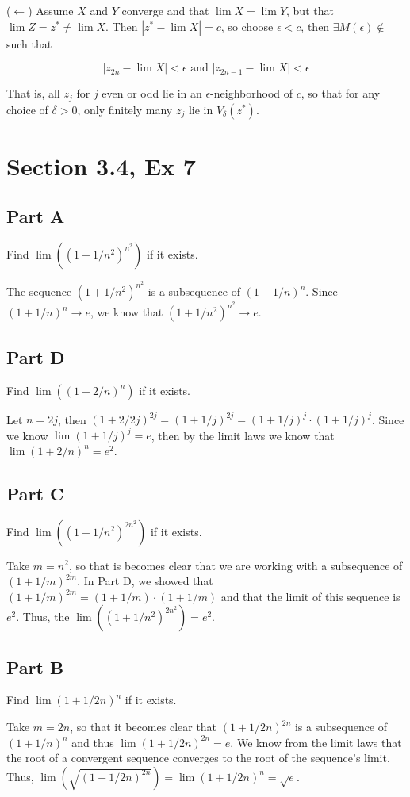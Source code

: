 \documentclass[paper=a4, fontsize=11pt]{scrartcl} %
\numberwithin{equation}{section} %
\numberwithin{figure}{section} %
\numberwithin{table}{section} %
\begin{document}
($\leftarrow$) Assume $X$ and $Y$ converge and that $\lim X = \lim Y$, but that $\lim Z = z^* \neq \lim X$. Then $|z^* - \lim X | = c$, so choose $\epsilon < c$, then $\exists M(\epsilon) \nin$ such that

\begin{equation*}
|z_{2n} - \lim X | < \epsilon \text{~and~} |z_{2n-1} - \lim X| < \epsilon
\end{equation*}

That is, all $z_j$ for $j$ even or odd lie in an $\epsilon$-neighborhood of $c$, so that for any choice of $\delta > 0$, only finitely many $z_j$ lie in $V_\delta(z^*)$. \done

\section*{Section 3.4, Ex 7}

\subsection*{Part A}

Find $\lim((1 + 1/n^2)^{n^2})$ if it exists.

\pf The sequence $(1 + 1/n^2)^{n^2}$ is a subsequence of $(1 + 1/n)^n$. Since $(1 + 1/n)^n \rightarrow e$, we know that $(1 + 1/n^2)^{n^2} \rightarrow e$. \done

\subsection*{Part D}

Find $\lim((1 + 2/n)^{n})$ if it exists.

\pf Let $n = 2j$, then $(1 + 2/2j)^{2j} = (1 + 1/j)^{2j} = (1 + 1/j)^j \cdot (1 + 1/j)^j$. Since we know $\lim(1 + 1/j)^j = e$, then by the limit laws we know that $\lim(1 + 2/n)^{n} = e^2$. \done

\subsection*{Part C}

Find $\lim((1 + 1/n^2)^{2n^2})$ if it exists.

\pf Take $m = n^2$, so that is becomes clear that we are working with a subsequence of $(1 + 1/m)^{2m}$. In Part D, we showed that $(1 + 1/m)^{2m} = (1 + 1/m) \cdot (1 + 1/m)$ and that the limit of this sequence is $e^2$. Thus, the $\lim((1 + 1/n^2)^{2n^2}) = e^2$. \done

\subsection*{Part B}

Find $\lim(1 + 1/2n)^n$ if it exists.

\pf Take $m = 2n$, so that it becomes clear that $(1 + 1/2n)^{2n}$ is a subsequence of $(1 + 1/n)^n$ and thus $\lim(1 + 1/2n)^{2n} = e$. We know from the limit laws that the root of a convergent sequence converges to the root of the sequence's limit. Thus, $\lim(\sqrt{(1 + 1/2n)^{2n}}) = \lim(1 + 1/2n)^n = \sqrt{e}$. \done
\end{document}

